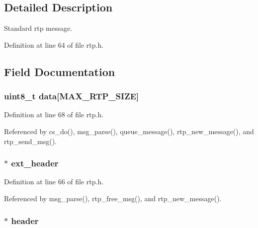 \subsection{Detailed Description}
Standard rtp message. 

Definition at line 64 of file rtp.\+h.



\subsection{Field Documentation}
\hypertarget{struct___r_t_p_message_a89f8083b50c7cef74e96797bb74f8757}{
\subsubsection[{data}]{\setlength{\rightskip}{0pt plus 5cm}uint8\+\_\+t data\mbox{[}{\bf M\+A\+X\+\_\+\+R\+T\+P\+\_\+\+S\+I\+Z\+E}\mbox{]}}}\label{struct___r_t_p_message_a89f8083b50c7cef74e96797bb74f8757}


Definition at line 68 of file rtp.\+h.



Referenced by cs\+\_\+do(), msg\+\_\+parse(), queue\+\_\+message(), rtp\+\_\+new\+\_\+message(), and rtp\+\_\+send\+\_\+msg().

\hypertarget{struct___r_t_p_message_aa0a69d899b1bee283ae1490f53bcd073}{
\subsubsection[{ext\+\_\+header}]{$\ast$ ext\+\_\+header}}\label{struct___r_t_p_message_aa0a69d899b1bee283ae1490f53bcd073}


Definition at line 66 of file rtp.\+h.



Referenced by msg\+\_\+parse(), rtp\+\_\+free\+\_\+msg(), and rtp\+\_\+new\+\_\+message().

\hypertarget{struct___r_t_p_message_afa0aee0d9eab5781c753943ec6a37584}{
\subsubsection[{header}]{$\ast$ header}}\label{struct___r_t_p_message_afa0aee0d9eab5781c753943ec6a37584}


